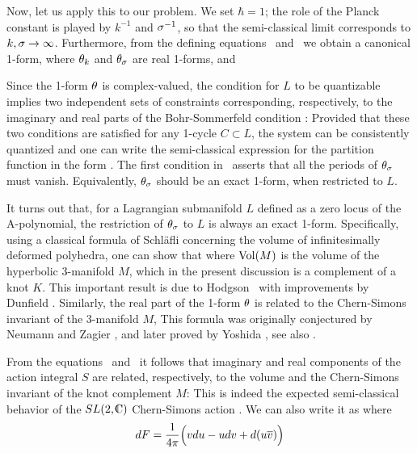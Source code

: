 Now, let us apply this to our problem.
We set $\hbar=1$; the role of the Planck constant
is played by $k^{-1}$ and $\s^{-1}$, so that
the semi-classical limit corresponds to $k,\s \to \infty$.
Furthermore, from the defining equations \totomega\
and \canoneform\ we obtain a canonical 1-form,
%
\eqn{}
%
where $\th_k$ and $\th_{\s}$ are real 1-forms,
%
\eqn{}
%
and
%
\eqn{}
%

Since the 1-form $\th$ is complex-valued, the condition
for $L$ to be quantizable implies two independent sets of
constraints corresponding, respectively, to the imaginary
and real parts of the Bohr-Sommerfeld condition \quantcond:
%
\eqn{}
%
Provided that these two conditions are satisfied for any
1-cycle $C \subset L$, the system can be consistently quantized
and one can write the semi-classical expression for
the partition function in the form \semiclassb.
The first condition in \ksquantcond\ asserts that
all the periods of $\th_{\s}$ must vanish.
Equivalently, $\th_{\s}$ should be an exact 1-form,
when restricted to $L$.

It turns out that, for a Lagrangian submanifold $L$
defined as a zero locus of the A-polynomial,
the restriction of $\th_{\s}$ to $L$ is always an exact 1-form.
Specifically, using a classical formula of Schl\"afli concerning
the volume of infinitesimally deformed polyhedra, one can show that
%
\eqn{}
%
where $\Vol (M)$ is the volume of the hyperbolic 3-manifold $M$,
which in the present discussion is a complement of a knot $K$.
This important result is due to Hodgson \Hodgson\
with improvements by Dunfield \Dunfield.
Similarly, the real part of the 1-form $\th$ is related
to the Chern-Simons invariant of the 3-manifold $M$,
%
\eqn{}
%
This formula was originally conjectured by Neumann and Zagier \NZagier,
and later proved by Yoshida \Yoshida, see also .

{}From the equations \volfla\ and \csfla\ it follows that
imaginary and real components of the action integral $S$ are related,
respectively, to the volume and the Chern-Simons invariant
of the knot complement $M$:
%
\eqn{}
%
This is indeed the expected semi-classical behavior of
the $SL(2,\IC)$ Chern-Simons action \iks.
We can also write it as
%
\eqn{}
%
where
$$
dF = {1 \over 4 \pi} \Big( v du - udv + d (u \bar v) \Big)
$$

